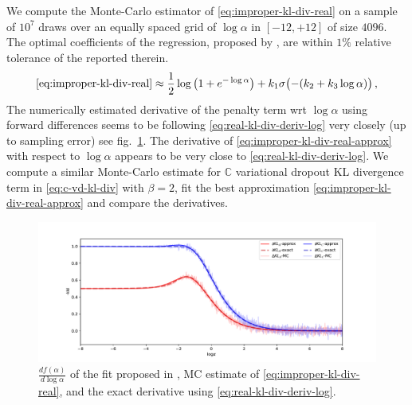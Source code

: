 \documentclass[a4paper,10pt]{article}
\newcommand{\cplx}{\mathbb{C}}
\begin{document}
We compute the Monte-Carlo estimator of \eqref{eq:improper-kl-div-real} on a sample of $10^7$
draws over an equally spaced grid of $\log \alpha$ in $[-12, +12]$ of size $4096$. The optimal
coefficients of the regression, proposed by \citet{molchanov_variational_2017}, are within
$1\%$ relative tolerance of the reported therein.
\begin{equation}  \label{eq:improper-kl-div-real-approx}
  \eqref{eq:improper-kl-div-real}
  \approx
    \frac12 \log{\bigl(1 + e^{-\log \alpha}\bigr)}
    + k_1 \sigma\bigl(- (k_2 + k_3 \log \alpha)\bigr)
  \,,
\end{equation}
The numerically estimated derivative of the penalty term wrt $\log \alpha$ using forward
differences seems to be following \eqref{eq:real-kl-div-deriv-log} very closely (up to
sampling error) see fig.~\ref{fig:molchanov-derivative-replica}. The derivative of
\eqref{eq:improper-kl-div-real-approx} with respect to $\log \alpha$ appears to be very close
to \eqref{eq:real-kl-div-deriv-log}. We compute a similar Monte-Carlo estimate for
$\cplx$ variational dropout KL divergence term in \eqref{eq:c-vd-kl-div} with $\beta = 2$,
fit the best approximation \eqref{eq:improper-kl-div-real-approx} and compare the derivatives.

\begin{figure}[!h]
  \centering
  \includegraphics[width=\linewidth]{../notebooks/assets/grad_log.pdf}
  \caption{$\tfrac{d f(\alpha)}{d \log{\alpha}}$ of the fit proposed in
  \citet{molchanov_variational_2017}, MC estimate of \eqref{eq:improper-kl-div-real},
  and the exact derivative using \eqref{eq:real-kl-div-deriv-log}.}
  \label{fig:molchanov-derivative-replica}
\end{figure}
\end{document}
